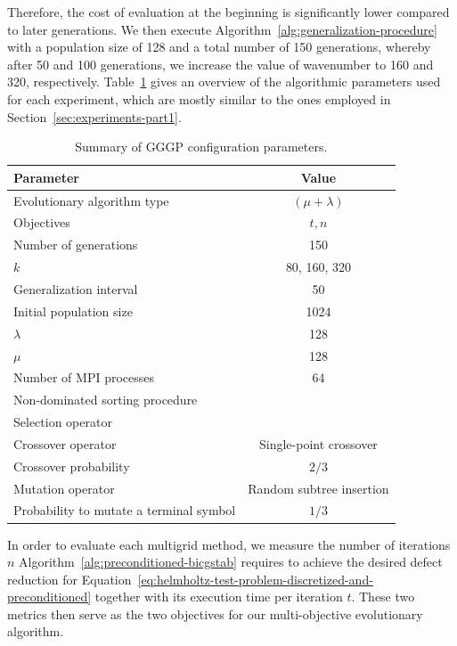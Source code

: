 Therefore, the cost of evaluation at the beginning is significantly lower compared to later generations.
We then execute Algorithm~\ref{alg:generalization-procedure} with a population size of 128 and a total number of 150 generations, whereby after 50 and 100 generations, we increase the value of wavenumber to 160 and 320, respectively.
Table~\ref{table:gp-parameters-helmholtz} gives an overview of the algorithmic parameters used for each experiment, which are mostly similar to the ones employed in Section~\ref{sec:experiments-part1}.
\begin{table}
	\centering
	\caption{Summary of GGGP configuration parameters.}
	\label{table:gp-parameters-helmholtz}
	\begin{tabular}{l c}
		\toprule
		Parameter & Value \\
		\midrule 
		Evolutionary algorithm type & $(\mu + \lambda)$ \\
		\midrule
		Objectives & $t, n$ \\
		\midrule
		Number of generations & 150 \\
		\midrule
		$k$ & 80, 160, 320 \\
		\midrule
		Generalization interval & 50 \\
		\midrule
		Initial population size & 1024 \\
		\midrule
		$\lambda$ & 128 \\
		\midrule
		$\mu$ & 128 \\
		\midrule
		Number of MPI processes & 64 \\
		\midrule
		Non-dominated sorting procedure & \cite{deb2002fast} \\ 
		\midrule
		Selection operator & \cite{deb2002fast} \\ 
		\midrule
		Crossover operator & Single-point crossover \\
		\midrule
		Crossover probability & $2/3$ \\
		\midrule
		Mutation operator & Random subtree insertion \\
		\midrule 
		Probability to mutate a terminal symbol & $1/3$ \\
		\bottomrule
	\end{tabular}
\end{table}
In order to evaluate each multigrid method, we measure the number of iterations $n$ Algorithm~\ref{alg:preconditioned-bicgstab} requires to achieve the desired defect reduction for Equation~\ref{eq:helmholtz-test-problem-discretized-and-preconditioned} together with its execution time per iteration $t$.
These two metrics then serve as the two objectives for our multi-objective evolutionary algorithm.
